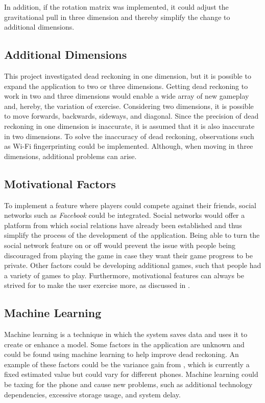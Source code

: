 In addition, if the rotation matrix was implemented, it could adjust the gravitational pull in three dimension and thereby simplify the change to additional dimensions.

\subsection{Additional Dimensions}
This project investigated dead reckoning in one dimension, but it is possible to expand the application to two or three dimensions. 
Getting dead reckoning to work in two and three dimensions would enable a wide array of new gameplay and, hereby, the variation of exercise. 
Considering two dimensions, it is possible to move forwards, backwards, sideways, and diagonal.  
Since the precision of dead reckoning in one dimension is inaccurate, it is assumed that it is also inaccurate in two dimensions.
To solve the inaccuracy of dead reckoning, observations such as Wi-Fi fingerprinting could be implemented.
Although, when moving in three dimensions, additional problems can arise.

\subsection{Motivational Factors}\label{section:motivational-factors}
To implement a feature where players could compete against their friends, social networks such as \textit{Facebook} could be integrated. 
Social networks would offer a platform from which social relations have already been established and thus simplify the process of the development of the application.
Being able to turn the social network feature on or off would prevent the issue with people being discouraged from playing the game in case they want their game progress to be private. 
Other factors could be developing additional games, such that people had a variety of games to play.
Furthermore, motivational features can always be strived for to make the user exercise more, as discussed in .

\subsection{Machine Learning}
Machine learning is a technique in which the system saves data and uses it to create or enhance a model.
Some factors in the application are unknown and could be found using machine learning to help improve dead reckoning.
An example of these factors could be the variance gain from , which is currently a fixed estimated value but could vary for different phones.
Machine learning could be taxing for the phone and cause new problems, such as additional technology dependencies, excessive storage usage, and system delay.